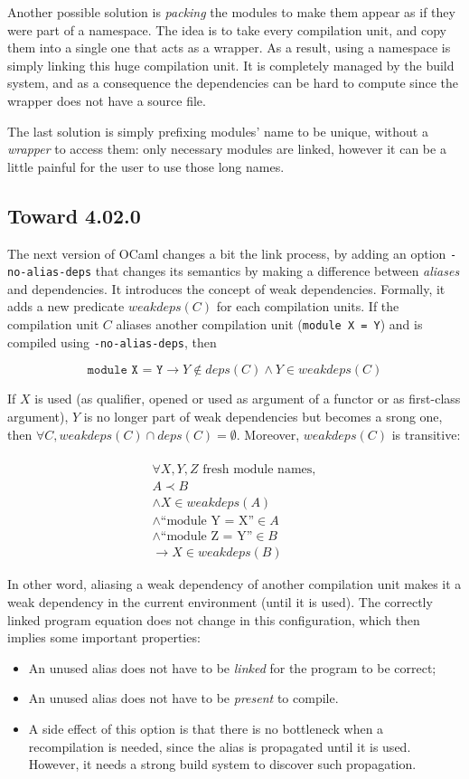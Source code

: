 \documentclass[11pt,a4paper]{article}
\begin{document}
Another possible solution is \emph{packing} the modules to make them appear as
if they were part of a namespace. The idea is to take every compilation unit,
and copy them into a single one that acts as a wrapper. As a result, using a
namespace is simply linking this huge compilation unit. It is completely managed
by the build system, and as a consequence the dependencies can be hard to
compute since the wrapper does not have a source file.

The last solution is simply prefixing modules' name to be unique, without a
\emph{wrapper} to access them: only necessary modules are linked, however it can
be a little painful for the user to use those long names.

\subsection{Toward 4.02.0}

The next version of OCaml changes a bit the link process, by adding an option
\texttt{-no-alias-deps} that changes its semantics by making a difference
between \emph{aliases} and dependencies. It introduces the concept of weak
dependencies. Formally, it adds a new predicate $weakdeps(C)$ for each
compilation units. If the compilation unit $C$ aliases another compilation unit
(\texttt{module X = Y}) and is compiled using \texttt{-no-alias-deps}, then

$$\texttt{module~X = Y} \rightarrow Y \notin deps(C) \land Y \in weakdeps(C)$$ 

If $X$ is used (as qualifier, opened or used as argument of a functor or as
first-class argument), $Y$ is no longer part of weak dependencies but becomes a
srong one, then $\forall C, weakdeps(C) \cap deps(C) = \emptyset$. Moreover,
$weakdeps(C)$ is transitive:

\begin{multline} \\
\forall X, Y, Z \text{ fresh module names}, \\ A \prec B \\
\land X \in weakdeps(A) \\ 
\land \text{``module Y = X''} \in A \\
\land \text{``module Z = Y''} \in B \\
\rightarrow X \in weakdeps(B)
\end{multline}

In other word, aliasing a weak dependency of another compilation unit makes it a
weak dependency in the current environment (until it is used). The correctly
linked program equation does not change in this configuration, which then
implies some important properties:
\begin{itemize}
\item An unused alias does not have to be \emph{linked} for the program to be correct;
\item An unused alias does not have to be \emph{present} to compile.
\item A side effect of this option is that there is no bottleneck when a
  recompilation is needed, since the alias is propagated until it is
  used. However, it needs a strong build system to discover such propagation.
\end{itemize}
\end{document}
